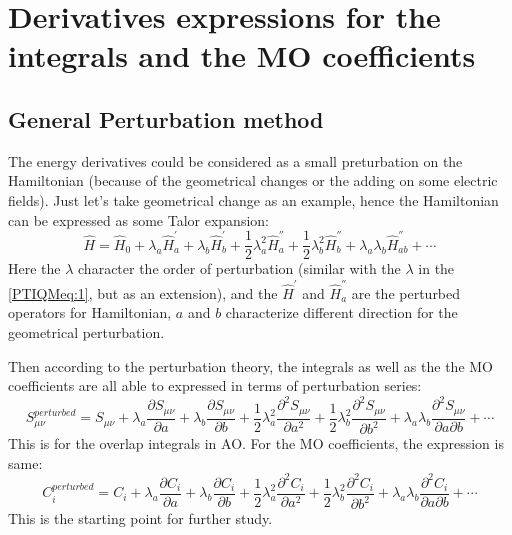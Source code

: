 \section{Derivatives expressions for the integrals and the MO
coefficients}
%
%
%
%
\subsection{General Perturbation method}
%
%
%
The energy derivatives could be considered as a small preturbation on
the Hamiltonian (because of the geometrical changes or the adding on
some electric fields). Just let's take geometrical change as an
example, hence the Hamiltonian can be expressed as some Talor
expansion:
\begin{equation} 
\label{General_Perturbation_method_eq:1}
 \hat{H} =
\hat{H}_{0}+\lambda_{a}\hat{H}_{a}^{'}+\lambda_{b}\hat{H}_{b}^{'} + 
\frac{1}{2}\lambda_{a}^{2}\hat{H}_{a}^{''} +
\frac{1}{2}\lambda_{b}^{2}\hat{H}_{b}^{''} + 
\lambda_{a}\lambda_{b}\hat{H}_{ab}^{''}    + \cdots
\end{equation}
Here the $\lambda$ character the order of perturbation (similar with
the $\lambda$ in the \ref{PTIQMeq:1}, but as an extension), and the
$\hat{H}^{'}$ and $\hat{H}_{a}^{''}$ are the perturbed operators for
Hamiltonian, $a$ and $b$ characterize different direction for the
geometrical perturbation.

Then according to the perturbation theory, the integrals as well as
the the MO coefficients are all able to expressed in terms of
perturbation series:
\begin{equation} 
\label{General_Perturbation_method_eq:2}
 S_{\mu\nu}^{perturbed} =
S_{\mu\nu}+
\lambda_{a}\frac{\partial S_{\mu\nu}}{\partial a} + 
\lambda_{b}\frac{\partial S_{\mu\nu}}{\partial b} +
\frac{1}{2}\lambda_{a}^{2}
\frac{\partial^{2} S_{\mu\nu}}{\partial a^{2}} + 
\frac{1}{2}\lambda_{b}^{2}
\frac{\partial^{2} S_{\mu\nu}}{\partial b^{2}} +
\lambda_{a}\lambda_{b}
\frac{\partial^{2} S_{\mu\nu}}{\partial a\partial b} +
\cdots
\end{equation}
This is for the overlap integrals in AO. For the MO coefficients, the
expression is same:
\begin{equation} 
\label{General_Perturbation_method_eq:3}
 C_{i}^{perturbed} =
C_{i}+
\lambda_{a}\frac{\partial C_{i}}{\partial a} + 
\lambda_{b}\frac{\partial C_{i}}{\partial b} +
\frac{1}{2}\lambda_{a}^{2}
\frac{\partial^{2} C_{i}}{\partial a^{2}} + 
\frac{1}{2}\lambda_{b}^{2}
\frac{\partial^{2} C_{i}}{\partial b^{2}} +
\lambda_{a}\lambda_{b}
\frac{\partial^{2} C_{i}}{\partial a\partial b} +
\cdots
\end{equation}
This is the starting point for further study. 





